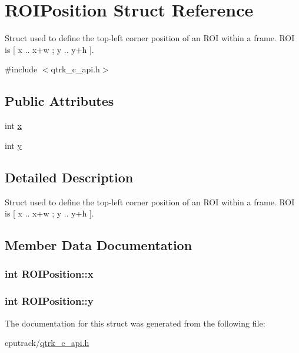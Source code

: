 \hypertarget{struct_r_o_i_position}{}\section{R\+O\+I\+Position Struct Reference}
\label{struct_r_o_i_position}


Struct used to define the top-\/left corner position of an R\+OI within a frame. R\+OI is \mbox{[} x .. x+w ; y .. y+h \mbox{]}.  




{\ttfamily \#include $<$qtrk\+\_\+c\+\_\+api.\+h$>$}

\subsection*{Public Attributes}
\begin{DoxyCompactItemize}
\item 
int \hyperlink{struct_r_o_i_position_a7ec9344e32faa05e10a72705ed24e9f5}{x}
\item 
int \hyperlink{struct_r_o_i_position_aa790f0665220dffa8d196003f6c01b47}{y}
\end{DoxyCompactItemize}


\subsection{Detailed Description}
Struct used to define the top-\/left corner position of an R\+OI within a frame. R\+OI is \mbox{[} x .. x+w ; y .. y+h \mbox{]}. 

\subsection{Member Data Documentation}
\subsubsection[{\texorpdfstring{x}{x}}]{\setlength{\rightskip}{0pt plus 5cm}int R\+O\+I\+Position\+::x}\hypertarget{struct_r_o_i_position_a7ec9344e32faa05e10a72705ed24e9f5}{}\label{struct_r_o_i_position_a7ec9344e32faa05e10a72705ed24e9f5}
\subsubsection[{\texorpdfstring{y}{y}}]{\setlength{\rightskip}{0pt plus 5cm}int R\+O\+I\+Position\+::y}\hypertarget{struct_r_o_i_position_aa790f0665220dffa8d196003f6c01b47}{}\label{struct_r_o_i_position_aa790f0665220dffa8d196003f6c01b47}


The documentation for this struct was generated from the following file\+:\begin{DoxyCompactItemize}
\item 
cputrack/\hyperlink{qtrk__c__api_8h}{qtrk\+\_\+c\+\_\+api.\+h}\end{DoxyCompactItemize}
